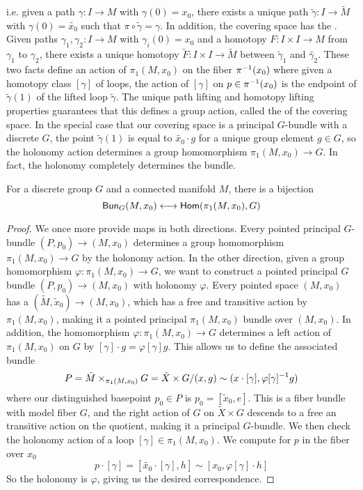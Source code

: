 i.e. given a path $\gamma : I \to M$ with $\gamma(0) = x_0$, there exists a
unique path $\tilde{\gamma} : I \to \tilde{M}$ with $\gamma(0) = \tilde{x_0}$
such that $\pi \circ \tilde{\gamma} = \gamma$. In addition, the covering
space has the . Given paths
$\gamma_1, \gamma_2 : I \to M$ with $\gamma_i(0) = x_0$ and a homotopy
$F : I \times I \to M$ from $\gamma_1$ to $\gamma_2$, there exists a unique
homotopy $\tilde{F} : I \times I \to \tilde{M}$ between $\tilde{\gamma}_1$
and $\tilde{\gamma_2}$. These two facts define an action of $\pi_1(M, x_0)$
on the fiber $\pi^{-1}(x_0)$ where given a homotopy class $[\gamma]$ of
loops, the action of $[\gamma]$ on $p \in \pi^{-1}(x_0)$ is the endpoint
of $\tilde{\gamma}(1)$ of the lifted loop $\tilde{\gamma}$. The unique
path lifting and homotopy lifting properties guarantees that this defines
a group action, called the  of the covering space. In the
special case that our covering space is a principal $G$-bundle with a discrete $G$,
the point $\tilde{\gamma}(1)$ is equal to $\tilde{x_0} \cdot g$ for a unique
group element $g \in G$, so the holonomy action determines a group homomorphism
$\pi_1(M, x_0) \to G$. In fact, the holonomy completely determines the bundle.
%
\begin{thm}
For a discrete group $G$ and a connected manifold $M$, there is a bijection
\[
\mathsf{Bun}_G(M,x_0) \longleftrightarrow \mathsf{Hom}(\pi_1(M,x_0), G)
\]
\end{thm}
%
\begin{proof}
We once more provide maps in both directions. Every pointed principal $G$-bundle
$(P,p_0) \to (M, x_0)$ determines a group homomorphism $\pi_1(M,x_0) \to G$
by the holonomy action. In the other direction, given a group homomorphism
$\varphi : \pi_1(M, x_0) \to G$, we want to construct a pointed principal $G$
bundle $(P, p_0) \to (M, x_0)$ with holonomy $\varphi$. Every pointed space
$(M, x_0)$ has a  $(\tilde{M}, \tilde{x}_0) \to (M,x_0)$,
which has a free and transitive action by $\pi_1(M,x_0)$, making it a pointed
principal $\pi_1(M,x_0)$ bundle over $(M,x_0)$. In addition, the homomorphism
$\varphi : \pi_1(M, x_0) \to G$ determines a left action of $\pi_1(M,x_0)$
on $G$ by $[\gamma] \cdot g = \varphi[\gamma] g$. This allows us to define
the associated bundle
\[
P = \tilde{M} \times_{\pi_1(M, x_0)} G = \tilde{X} \times G
/ (x,g) \sim (x \cdot [\gamma], \varphi[\gamma]^{-1} g)
\]
where our distinguished basepoint $p_0 \in P$ is $p_0 = [\tilde{x}_0, e]$.
This is a fiber bundle with model fiber $G$, and the right action of $G$
on $\tilde{X} \times G$ descends to a free an transitive action on the quotient,
making it a principal $G$-bundle. We then check the holonomy action of a
loop $[\gamma] \in \pi_1(M, x_0)$. We compute for $p$ in the fiber over $x_0$
\[
p \cdot [\gamma] = [\tilde{x_0} \cdot [\gamma], h] \sim [x_0, \varphi[\gamma]\cdot h]
\]
So the holonomy is $\varphi$, giving us the desired correspondence.
\end{proof}
